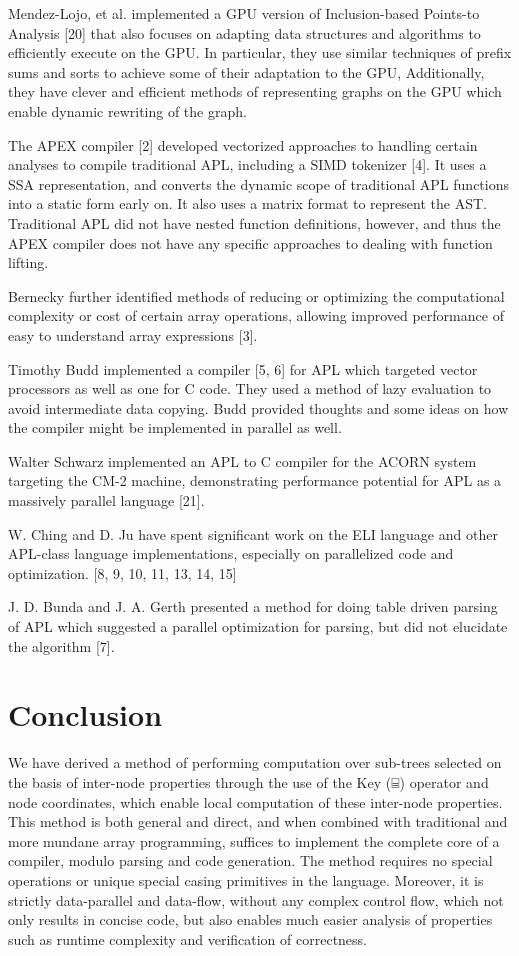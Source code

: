 \documentclass[numbers,preprint]{sigplanconf}
\begin{document}
Mendez-Lojo, et al. implemented a GPU version of Inclusion-based
Points-to Analysis [20] that also focuses on adapting data structures
and algorithms to efficiently execute on the GPU. In particular,
they use similar techniques of prefix sums and sorts to achieve some
of their adaptation to the GPU, Additionally, they have clever and
efficient methods of representing graphs on the GPU which enable
dynamic rewriting of the graph.

The APEX compiler [2] developed vectorized approaches to handling
certain analyses to compile traditional APL, including a SIMD tokenizer
[4]. It uses a SSA representation, and converts the dynamic scope of
traditional APL functions into a static form early on. It also uses
a matrix format to represent the AST. Traditional APL did not have
nested function definitions, however, and thus the APEX compiler does
not have any specific approaches to dealing with function lifting.

Bernecky further identified methods of reducing or optimizing the
computational complexity or cost of certain array operations, allowing
improved performance of easy to understand array expressions [3].

Timothy Budd implemented a compiler [5, 6] for APL which targeted
vector processors as well as one for C code. They used a method of
lazy evaluation to avoid intermediate data copying. Budd provided
thoughts and some ideas on how the compiler might be implemented in
parallel as well.

Walter Schwarz implemented an APL to C compiler for the ACORN system
targeting the CM-2 machine, demonstrating performance potential for
APL as a massively parallel language [21].

W. Ching and D. Ju have spent significant work on the ELI language
and other APL-class language
 implementations, especially on parallelized code and optimization. [8,
 9, 10, 11, 13, 14, 15]

J. D. Bunda and J. A. Gerth presented a method for doing table driven
parsing of APL which suggested a parallel optimization for parsing,
but did not elucidate the algorithm [7].

\section{Conclusion}

We have derived a method of performing computation over sub-trees
selected on the basis of inter-node properties through the use of the
Key (⌸) operator and node coordinates, which enable local computation
of these inter-node properties. This method is both general and direct,
and when combined with traditional and more mundane array programming,
suffices to implement the complete core of a compiler, modulo parsing
and code generation. The method requires no special operations or
unique special casing primitives in the language. Moreover, it is
strictly data-parallel and data-flow, without any complex control flow,
which not only results in concise code, but also enables much easier
analysis of properties such as runtime complexity and verification
of correctness.
\end{document}
